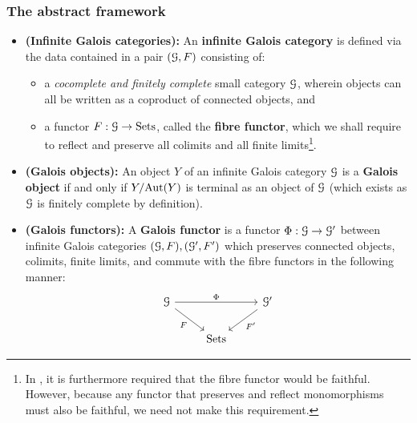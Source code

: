         \subsubsection{The abstract framework}
            \begin{definition} \label{def: infinite_galois_categories}
                \noindent
                \begin{itemize}
                    \item \textbf{(Infinite Galois categories):} An \textbf{infinite Galois category} is defined via the data contained in a pair $(\mathcal{G}, F)$ consisting of:
                    \begin{itemize}
                        \item a \textit{cocomplete and \textit{finitely} complete} small category $\mathcal{G}$, wherein objects can all be written as a coproduct of connected objects, and
                        \item a functor $F: \mathcal{G} \to \mathrm{Sets}$, called the \textbf{fibre functor}, which we shall require to reflect and preserve all colimits and all finite limits\footnote{In \cite[Definition 7.2.1]{bhatt_scholze_2014_pro_etale}, it is furthermore required that the fibre functor would be faithful. However, because any functor that preserves and reflect monomorphisms must also be faithful, we need not make this requirement.}.
                    \end{itemize}
                    \item \textbf{(Galois objects):} An object $Y$ of an infinite Galois category $\mathcal{G}$ is a \textbf{Galois object} if and only if $Y/\mathrm{Aut}(Y)$ is terminal as an object of $\mathcal{G}$ (which exists as $\mathcal{G}$ is finitely complete by definition).
                    \item \textbf{(Galois functors):} A \textbf{Galois functor} is a functor $\Phi: \mathcal{G} \to \mathcal{G}'$ between infinite Galois categories $(\mathcal{G}, F), (\mathcal{G}', F')$ which preserves connected objects, colimits, finite limits, and commute with the fibre functors in the following manner:
                        $$
                            \begin{tikzcd}
                            	\calG && {\calG'} \\
                            	& \Sets
                            	\arrow["F"', from=1-1, to=2-2]
                            	\arrow["{F'}", from=1-3, to=2-2]
                            	\arrow["\Phi", from=1-1, to=1-3]
                            \end{tikzcd}
                        $$
                \end{itemize}
            \end{definition}    
